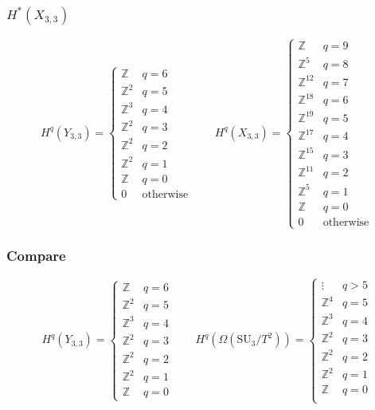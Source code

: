 \documentclass{beamer} %
\newcommand{\Z}{\mathbb{Z}}
\newcommand{\SU}{\mathrm{SU}}
\begin{document}
\begin{frame}
  \frametitle{$H^*(X_{3,3})$}
  \[ H^q(Y_{3,3}) =
  \begin{cases}
    \Z & q=6 \\
    \Z^{2} & q=5 \\
    \Z^{3} & q=4 \\
    \Z^{2} & q=3 \\
    \Z^{2} & q=2 \\
    \Z^{2} & q=1 \\
    \Z & q = 0 \\
    0 & \text{otherwise}
  \end{cases}
  \qquad
  H^q(X_{3,3}) =
  \begin{cases}
    \Z & q = 9\\
    \Z^{5} & q = 8\\
    \Z^{12} & q = 7\\
    \Z^{18} & q = 6\\
    \Z^{19} & q = 5\\
    \Z^{17} & q = 4\\
    \Z^{15} & q = 3\\
    \Z^{11} & q = 2\\
    \Z^{5} & q = 1\\
    \Z & q = 0 \\
    0 & \text{otherwise}
  \end{cases} \]

\end{frame}

\begin{frame}
  \frametitle{Compare}
  \[ H^q(Y_{3,3}) =
  \begin{cases}
    \Z & q=6 \\
    \Z^{2} & q=5 \\
    \Z^{3} & q=4 \\
    \Z^{2} & q=3 \\
    \Z^{2} & q=2 \\
    \Z^{2} & q=1 \\
    \Z & q = 0
  \end{cases}
  \qquad
  H^q(\Omega(\SU_3/T^2)) =
  \begin{cases}
    \vdots & q > 5 \\
    \Z^4 & q = 5 \\
    \Z^3 & q = 4 \\
    \Z^2 & q = 3 \\
    \Z^2 & q = 2 \\
    \Z^2 & q = 1 \\
    \Z & q = 0 \\
  \end{cases} \]

\end{frame}
\end{document}
